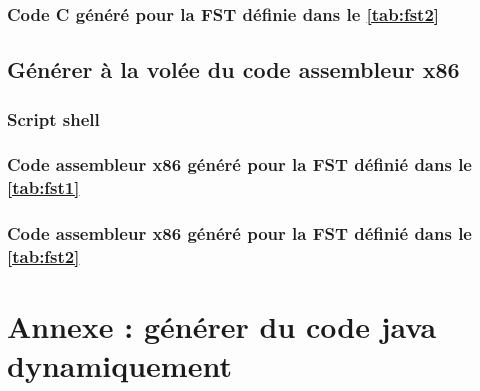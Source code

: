 

\clearpage
\subsubsection{Code C généré pour la FST définie dans le \autoref{tab:fst2}}




\clearpage
\subsection{Générer à la volée du code assembleur x86}
\label{sec:annexe:shell:asm}
\subsubsection{Script shell}



\clearpage
\subsubsection{Code assembleur x86 généré pour la FST définié dans le \autoref{tab:fst1}}



\clearpage
\subsubsection{Code assembleur x86 généré pour la FST définié dans le \autoref{tab:fst2}}



\clearpage

\section{Annexe : générer du code java dynamiquement}

